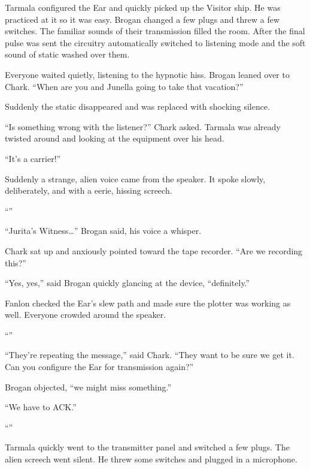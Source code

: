 Tarmala configured the Ear and quickly picked up the Visitor ship. He was practiced at it so it
was easy. Brogan changed a few plugs and threw a few switches. The familiar sounds of their
transmission filled the room. After the final pulse was sent the circuitry automatically
switched to listening mode and the soft sound of static washed over them.

Everyone waited quietly, listening to the hypnotic hiss. Brogan leaned over to Chark. ``When are
you and Junella going to take that vacation?''

Suddenly the static disappeared and was replaced with shocking silence.

``Is something wrong with the listener?'' Chark asked. Tarmala was already twisted around and
looking at the equipment over his head.

``It's a carrier!''

Suddenly a strange, alien voice came from the speaker. It spoke slowly, deliberately, and with a
eerie, hissing screech.

``''

``Jurita's Witness\ldots'' Brogan said, his voice a whisper.

Chark sat up and anxiously pointed toward the tape recorder. ``Are we recording this?''

``Yes, yes,'' said Brogan quickly glancing at the device, ``definitely.''

Fanlon checked the Ear's slew path and made sure the plotter was working as well. Everyone
crowded around the speaker.

``''

``They're repeating the message,'' said Chark. ``They want to be sure we get it. Can you
configure the Ear for transmission again?''

Brogan objected, ``we might miss something.''

``We have to ACK.''

``''

Tarmala quickly went to the transmitter panel and switched a few plugs. The alien screech went
silent. He threw some switches and plugged in a microphone.

